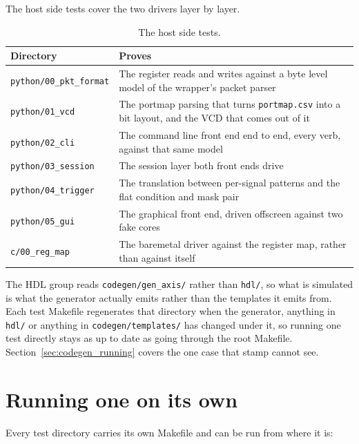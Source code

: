 \documentclass[../manual.tex]{subfiles}
\begin{document}
The host side tests cover the two drivers layer by layer.

\begin{table}[H]
    \centering
    \begin{tabularx}{\textwidth}{|l|X|}
        \hline
        \rowcolor{gray!40} \textbf{Directory} & \textbf{Proves} \\
        \hline
        \texttt{python/00\_pkt\_format} & The register reads and writes against a byte level model of the wrapper's packet parser \\
        \hline
        \texttt{python/01\_vcd} & The portmap parsing that turns \texttt{portmap.csv} into a bit layout, and the VCD that comes out of it \\
        \hline
        \texttt{python/02\_cli} & The command line front end end to end, every verb, against that same model \\
        \hline
        \texttt{python/03\_session} & The session layer both front ends drive \\
        \hline
        \texttt{python/04\_trigger} & The translation between per-signal patterns and the flat condition and mask pair \\
        \hline
        \texttt{python/05\_gui} & The graphical front end, driven offscreen against two fake cores \\
        \hline
        \texttt{c/00\_reg\_map} & The baremetal driver against the register map, rather than against itself \\
        \hline
    \end{tabularx}
    \caption{The host side tests.}
    \label{tab:nohw_host}
\end{table}

The HDL group reads \texttt{codegen/gen\_axis/} rather than \texttt{hdl/}, so what is simulated is what the generator actually emits rather than the templates it emits from. Each test Makefile regenerates that directory when the generator, anything in \texttt{hdl/} or anything in \texttt{codegen/templates/} has changed under it, so running one test directly stays as up to date as going through the root Makefile. Section~\ref{sec:codegen_running} covers the one case that stamp cannot see.

\section{Running one on its own}
\label{sec:nohw_single}

Every test directory carries its own Makefile and can be run from where it is:
\end{document}

